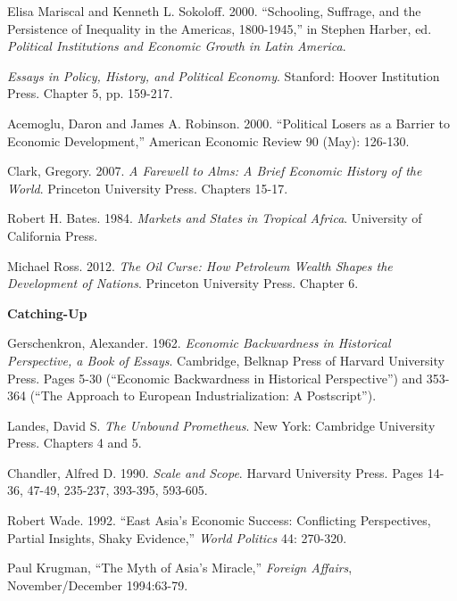 \documentclass[letterpaper]{article}
\renewenvironment{itemize}{
  \begin{list}{}{
    \setlength{\leftmargin}{1.5em}
  }
}{
  \end{list}
}
\begin{document}
\begin{enumerate}
	\begin{itemize}
		\item[$\bullet$] Elisa Mariscal and Kenneth L. Sokoloff. 2000. ``Schooling, Suffrage, and the Persistence of Inequality in the Americas, 1800-1945,'' in Stephen Harber, ed. \emph{Political Institutions and Economic Growth in Latin America}. 
		\item[$\bullet$] \emph{Essays in Policy, History, and Political Economy}. Stanford: Hoover Institution Press. Chapter 5, pp. 159-217.
		\item[$\bullet$] Acemoglu, Daron and James A. Robinson. 2000. ``Political Losers as a Barrier to Economic Development,'' American Economic Review 90 (May): 126-130.
		\item[$\bullet$] Clark, Gregory. 2007. \emph{A Farewell to Alms: A Brief Economic History of the World}. Princeton University Press. Chapters 15-17.
		\item[$\bullet$] Robert H. Bates. 1984. \emph{Markets and States in Tropical Africa}. University of California Press.
		\item[$\bullet$] Michael Ross. 2012. \emph{The Oil Curse: How Petroleum Wealth Shapes the Development of Nations}.
		Princeton University Press. Chapter 6.
	\end{itemize}



\item {\bf Catching-Up}

	\begin{itemize}
		\item[$\bullet$] Gerschenkron, Alexander. 1962. \emph{Economic Backwardness in Historical Perspective, a Book of Essays}. Cambridge, Belknap Press of Harvard University Press. Pages 5-30 (``Economic Backwardness in Historical Perspective'') and 353-364 (``The Approach to European Industrialization: A Postscript'').
		\item[$\bullet$] Landes, David S. \emph{The Unbound Prometheus}. New York: Cambridge University Press. Chapters 4 and 5. 
		\item[$\bullet$] Chandler, Alfred D. 1990. \emph{Scale and Scope}. Harvard University Press. Pages 14-36, 47-49, 235-237, 393-395, 593-605.
		\item[$\bullet$] Robert Wade. 1992. ``East Asia's Economic Success: Conflicting Perspectives, Partial Insights, Shaky
		Evidence,'' \emph{World Politics} 44: 270-320.
		\item[$\bullet$] Paul Krugman, ``The Myth of Asia's Miracle,'' \emph{Foreign Affairs}, November/December 1994:63-79.
	\end{itemize}




\end{enumerate}
\end{document}
